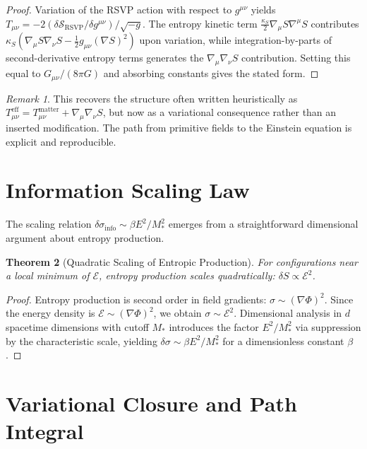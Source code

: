\documentclass[12pt,a4paper,openany]{book}
\theoremstyle{plain}
\newtheorem{theorem}{Theorem}[chapter]
\theoremstyle{definition}
\theoremstyle{remark}
\newtheorem{remark}[theorem]{Remark}
\begin{document}
\begin{proof}
Variation of the RSVP action with respect to $g^{\mu\nu}$ yields $T_{\mu\nu} = -2(\delta\mathcal{S}_{\mathrm{RSVP}}/\delta g^{\mu\nu})/\sqrt{-g}$. The entropy kinetic term $\frac{\kappa_S}{2}\nabla_\mu S\nabla^\mu S$ contributes $\kappa_S(\nabla_\mu S\nabla_\nu S - \frac{1}{2}g_{\mu\nu}(\nabla S)^2)$ upon variation, while integration-by-parts of second-derivative entropy terms generates the $\nabla_\mu\nabla_\nu S$ contribution. Setting this equal to $G_{\mu\nu}/(8\pi G)$ and absorbing constants gives the stated form.
\end{proof}

\begin{remark}
This recovers the structure often written heuristically as $T_{\mu\nu}^{\mathrm{eff}} = T_{\mu\nu}^{\mathrm{matter}} + \nabla_\mu\nabla_\nu S$, but now as a variational consequence rather than an inserted modification. The path from primitive fields to the Einstein equation is explicit and reproducible.
\end{remark}

\section{Information Scaling Law}

The scaling relation $\delta\sigma_{\mathrm{info}} \sim \beta E^2/M_*^2$ emerges from a straightforward dimensional argument about entropy production.

\begin{theorem}[Quadratic Scaling of Entropic Production]
\label{thm:scaling}
For configurations near a local minimum of $\mathcal{E}$, entropy production scales quadratically: $\delta S \propto \mathcal{E}^2$.
\end{theorem}

\begin{proof}
Entropy production is second order in field gradients: $\sigma \sim (\nabla\Phi)^2$. Since the energy density is $\mathcal{E} \sim (\nabla\Phi)^2$, we obtain $\sigma \sim \mathcal{E}^2$. Dimensional analysis in $d$ spacetime dimensions with cutoff $M_*$ introduces the factor $E^2/M_*^2$ via suppression by the characteristic scale, yielding $\delta\sigma \sim \beta E^2/M_*^2$ for a dimensionless constant $\beta$.
\end{proof}

\section{Variational Closure and Path Integral}
\end{document}
